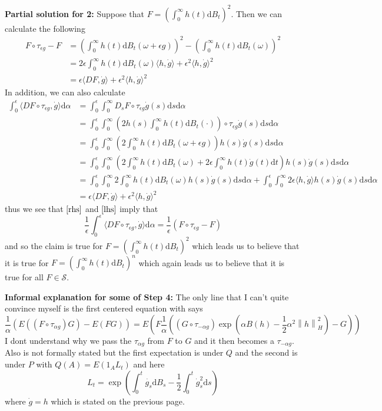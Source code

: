 \documentclass[a4paper,11pt]{article}
\numberwithin{equation}{section}
\theoremstyle{plain}
\theoremstyle{definition}
\newcommand{\ud}{\ensuremath{\mathrm{d}}}
\newcommand{\Norm}[1]{\left\|  #1   \right\|}
\numberwithin{NQ}{section}
\numberwithin{LQ}{section}
\numberwithin{ZQ}{section}
\begin{document}
\textbf{Partial solution for 2:} Suppose that $F=\left(\int_0^\infty h(t)\ud B_t\right)^2$. Then we can calculate the following
\begin{align}
	F\circ \tau_{\epsilon g} - F &= \left(\int_0^\infty h(t) \ud B_t(\omega + \epsilon g)\right)^2 -  \left(\int_0^\infty h(t) \ud B_t(\omega )\right)^2 \nonumber
	\\&= 2\epsilon \int_0^\infty h(t) \ud B_t(\omega)\langle h, \dot{g} \rangle + \epsilon^2 \langle h, \dot{g} \rangle^2 \nonumber
	\\&= \epsilon\langle DF, \dot{g} \rangle + \epsilon^2 \langle h, \dot{g} \rangle^2\label{lhs}
\end{align}
In addition, we can also calculate 
\begin{align}
\int_0^\epsilon \langle DF\circ\tau_{\epsilon g} ,\dot{g}\rangle \ud \alpha &= \int_0^\epsilon \int_0^\infty D_sF\circ \tau_{\epsilon g} \dot{g}(s) \ud s \ud \alpha \nonumber
\\& =  \int_0^\epsilon \int_0^\infty \left(2h(s)\int_0^\infty h(t) \ud B_t(\cdot)\right)\circ \tau_{\epsilon g} \dot{g}(s) \ud s \ud \alpha \nonumber
\\&= \int_0^\epsilon \int_0^\infty \left(2\int_0^\infty h(t) \ud B_t(\omega + \epsilon g)\right) h(s)\dot{g}(s) \ud s \ud \alpha \nonumber 
\\&= \int_0^\epsilon \int_0^\infty \left(2\int_0^\infty h(t) \ud B_t(\omega) + 2\epsilon\int_0^\infty h(t)\dot{g}(t) \ud t\right)h(s) \dot{g}(s) \ud s \ud \alpha \nonumber 
\\&= \int_0^\epsilon \int_0^\infty 2\int_0^\infty h(t) \ud B_t(\omega)h(s) \dot{g}(s) \ud s \ud \alpha  + \int_0^\epsilon \int_0^\infty2\epsilon\langle h,\dot{g} \rangle h(s) \dot{g}(s) \ud s \ud \alpha \nonumber 
\\&=\epsilon \langle DF,\dot{g} \rangle + \epsilon^2\langle h, \dot{g}\rangle^2 \label{rhs} 
\end{align}
thus we see that $\eqref{rhs}$ and $\eqref{lhs}$ imply that 
\[
	\frac{1}{\epsilon}	\int_0^\epsilon \langle DF\circ\tau_{\epsilon g} ,\dot{g}\rangle \ud \alpha = \frac{1}{\epsilon}(F\circ \tau_{\epsilon g} - F )
\]
and so the claim is true for $F= \left(\int_0^\infty h(t) \ud B_t\right)^2$ which leads us to believe that it is true for $F= \left(\int_0^\infty h(t) \ud B_t\right)^n$ which again leads us to believe that it is true for all $F\in \mathcal S$. 

\textbf{Informal explanation for some of Step 4:}
The only line that I can't quite convince myself is the first centered equation with says 
\[
	\frac{1}{\alpha} \left(E((F\circ \tau_{\alpha g})G)-E(FG)\right) = E\left(F \frac{1}{\alpha}\left((G\circ \tau_{-\alpha g})\exp(\alpha B(h)-\frac{1}{2}\alpha^2 \Norm{h}_H^2)-G\right)\right)
\]
I dont understand why we pass the $\tau_{\alpha g}$ from $F$ to $G$ and it then becomes a $\tau_{-\alpha g}$. Also is not formally stated but the first expectation is under $Q$ and the second is under $P$ with $Q(A)=E(1_AL_t)$ and here 
\[
	L_t = \exp\left( \int_0^t \dot{g_s} \ud B_s - \frac{1}{2}\int_0^t \dot{g}_s^2 \ud s \right)
\]
where $\dot{g} = h$ which is stated on the previous page. 
\end{document}
